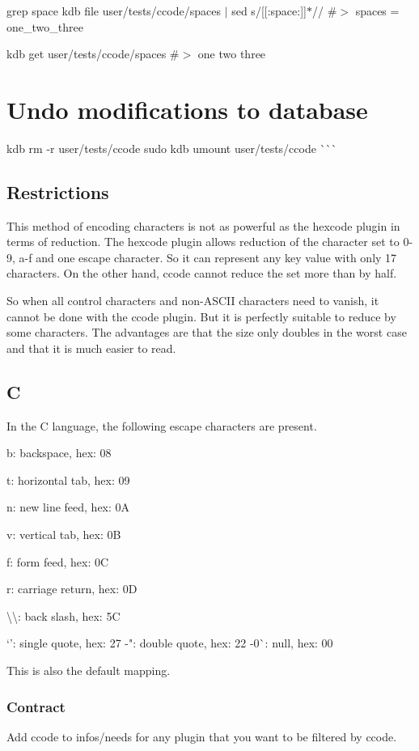 grep \textquotesingle{}space\textquotesingle{} {\ttfamily kdb file user/tests/ccode/spaces} $\vert$ sed \textquotesingle{}s/\mbox{[}\mbox{[}\+:space\+:\mbox{]}\mbox{]}$\ast$//\textquotesingle{} \#$>$ spaces = one\+\_\+two\+\_\+three

kdb get user/tests/ccode/spaces \#$>$ one two three\hypertarget{autotoc_md78_autotoc_md84}{}\section{Undo modifications to database}\label{autotoc_md78_autotoc_md84}
kdb rm -\/r user/tests/ccode sudo kdb umount user/tests/ccode \`{}\`{}\`{}\hypertarget{autotoc_md78_autotoc_md85}{}\subsection{Restrictions}\label{autotoc_md78_autotoc_md85}
This method of encoding characters is not as powerful as the hexcode plugin in terms of reduction. The hexcode plugin allows reduction of the character set to \textquotesingle{}0\textquotesingle{}-\/\textquotesingle{}9\textquotesingle{}, \textquotesingle{}a\textquotesingle{}-\/\textquotesingle{}f\textquotesingle{} and one escape character. So it can represent any key value with only 17 characters. On the other hand, ccode cannot reduce the set more than by half.

So when all control characters and non-\/\+A\+S\+C\+II characters need to vanish, it cannot be done with the ccode plugin. But it is perfectly suitable to reduce by some characters. The advantages are that the size only doubles in the worst case and that it is much easier to read.\hypertarget{autotoc_md78_autotoc_md86}{}\subsection{C}\label{autotoc_md78_autotoc_md86}
In the C language, the following escape characters are present.


\begin{DoxyItemize}
\item {\ttfamily b}\+: backspace, hex\+: 08
\item {\ttfamily t}\+: horizontal tab, hex\+: 09
\item {\ttfamily n}\+: new line feed, hex\+: 0A
\item {\ttfamily v}\+: vertical tab, hex\+: 0B
\item {\ttfamily f}\+: form feed, hex\+: 0C
\item {\ttfamily r}\+: carriage return, hex\+: 0D
\item {\ttfamily \textbackslash{}\textbackslash{}}\+: back slash, hex\+: 5C
\item `'{\ttfamily \+: single quote, hex\+: 27 -\/}"{\ttfamily \+: double quote, hex\+: 22 -\/}0\`{}\+: null, hex\+: 00
\end{DoxyItemize}

This is also the default mapping.\hypertarget{autotoc_md78_autotoc_md87}{}\subsubsection{Contract}\label{autotoc_md78_autotoc_md87}
Add {\ttfamily ccode} to {\ttfamily infos/needs} for any plugin that you want to be filtered by ccode. 
